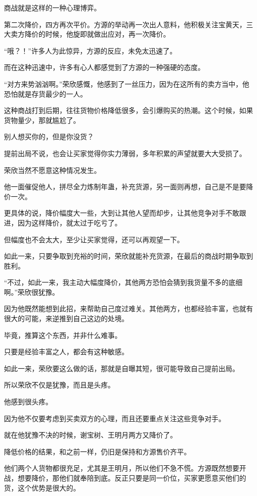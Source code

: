 \begin{this_body}
商战就是这样的一种心理博弈。

第二次降价，四方再次平价。方源的举动再一次出人意料，他积极关注宝黄天，三大卖方降价的时候，他旋即就做出应对，再一次降价。

“哦？！”许多人为此惊异，方源的反应，未免太迅速了。

而在这种迅速中，许多有心人都感觉到了方源的一种强硬的态度。

“对方来势汹汹啊。”荣欣感慨，他感到了一丝压力，因为在这所有的卖方当中，他恐怕就是存货最少的一人。

这种商战打到后期，往往货物价格降低很多，会引爆购买的热潮。这个时候，如果货物量少，那就尴尬了。

别人想买你的，但是你没货？

提前出局不说，也会让买家觉得你实力薄弱，多年积累的声望就要大大受损了。

荣欣当然不愿意这种情况发生。

他一面催促他人，拼尽全力炼制年蛊，补充货源，另一面则再想，自己是不是要降价一次。

更具体的说，降价幅度大一些，大到让其他人望而却步，让其他竞争对手不敢跟进，因为这样降价，就太过于吃亏了。

但幅度也不会太大，至少让买家觉得，还可以再观望一下。

如此一来，只要争取到充裕的时间，荣欣就能补充货源，在最后的商战时期争取到胜利。

“不过，如此一来，我主动大幅度降价，其他两方恐怕会猜到我货量不多的底细啊。”荣欣很犹豫。

因为他既然能想到此招，来帮助自己度过难关。其他两方，也都经验丰富，也就有很大的可能，来逆推到自己这边的处境。

毕竟，推算这个东西，并非什么难事。

只要是经验丰富之人，都会有这种敏感。

如此一来，荣欣要这么做的话，那就是自曝其短，很可能导致自己提前出局。

所以荣欣不仅是犹豫，而且是头疼。

他感到很头疼。

因为他不仅要考虑到买卖双方的心理，而且还要重点关注这些竞争对手。

就在他犹豫不决的时候，谢宝树、王明月两方又降价了。

降低价格的结果，和之前一样，仍旧是保持和方源售价齐平。

他们两个人货物都很充足，尤其是王明月，所以他们不急不慌。方源既然想要开战，想要降价，那他们就奉陪到底。反正只要是同一价位，买家更愿意买他们的货，这个优势是很大的。


\end{this_body}
